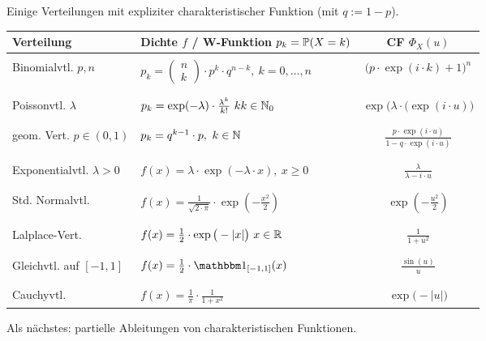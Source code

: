\begin{beisp}
Einige Verteilungen mit expliziter charakteristischer Funktion (mit $q:=1-p$).\nl
\begin{tabular}{l|l|c}
Verteilung & Dichte $f$ / W-Funktion $p_k=\P(X=k)$ & CF $\Phi_X(u)$\\ \hline\hline
					 &&\\
Binomialvtl. $p,n$ & $p_k=\begin{pmatrix}
n\\ k
\end{pmatrix}\cdot p^k\cdot q^{n-k},~k=0,\ldots, n$ & $\big(p\cdot\exp(i\cdot k)+1\big)^n$\\&&\\ \hline &&\\
Poissonvtl. $\lambda$ & $p_k=\exp(-\lambda)\cdot\frac{\lambda^k}{k!}~kk\in\N_0$ & $\exp\big(\lambda\cdot(\exp(i\cdot u)\big)$ \\ &&\\ \hline &&\\
geom. Vert. $p\in(0,1)$ & $p_k=q^{k-1}\cdot p,~k\in\N$ & $\frac{p\cdot\exp(i\cdot u)}{1-q\cdot\exp(i\cdot u)}$ \\ &&\\ \hline &&\\
Exponentialvtl. $\lambda>0$ & $f(x)=\lambda\cdot\exp(-\lambda\cdot x),~x\geq0$ & $\frac{\lambda}{\lambda-i\cdot u}$\\ &&\\ \hline &&\\
Std. Normalvtl. & $f(x)=\frac{1}{\sqrt{2\cdot \pi}}\cdot\exp\left(-\frac{x^2}{2}\right)$ & $\exp\left(-\frac{u^2}{2}\right)$\\ &&\\ \hline &&\\
Lalplace-Vert. & $f(x)=\frac{1}{2}\cdot\exp\big(-|x|\big)~x\in\R$ & $\frac{1}{1+u^2}$\\ &&\\ \hline &&\\
Gleichvtl. auf $[-1,1]$ & $f(x)=\frac{1}{2}\cdot\indi_{[-1,1]}(x)$ & $\frac{\sin(u)}{u}$\\ &&\\ \hline &&\\
Cauchyvtl. & $f(x)=\frac{1}{\pi}\cdot\frac{1}{1+x^2}$ & $\exp\big(-|u|\big)$
\end{tabular}
\end{beisp}

Als nächstes: partielle Ableitungen von charakteristischen Funktionen.

